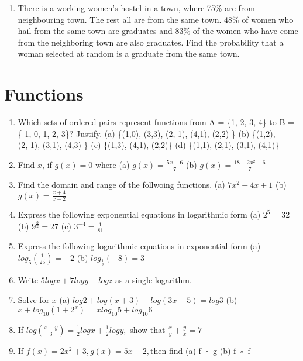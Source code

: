 \documentclass[17pt]{extarticle}
\begin{document}
\begin{multicols}{2}
\begin{enumerate}
\item There is a working women's hostel in a
town, where 75\% are from neighbouring
town. The rest all are from the same town.
48\% of women who hail from the same
town are graduates and 83\% of the women
who have come from the neighboring town
are also graduates. Find the probability that
a woman selected at random is a graduate
from the same town.




\end{enumerate} 

\section{Functions}
\noindent
\begin{enumerate}
 \item  Which sets of ordered pairs represent
functions from A = \{1, 2, 3, 4\} to B = \{-1, 0,
1, 2, 3\}? Justify. 
	 (a)	 \{(1,0), (3,3), (2,-1), (4,1), (2,2) \}    
	 (b) 	\{(1,2), (2,-1), (3,1), (4,3) \}   	 (c) 	\{(1,3), (4,1), (2,2)\}	 (d) 	\{(1,1), (2,1), (3,1), (4,1)\}
 
 \item Find $x$, if $g (x) = 0$ where  (a) $g(x)=\frac{5x-6}{7}$ (b) $g(x)=\frac{18-2x^2-6}{7}$ 
 
 \item Find the domain and range of the follwoing
functions. (a) $7x^2-4x+1$ (b) $g (x) = \frac{x+4}{x-2}$

\item Express the following exponential equations
in logarithmic form  (a) $2^5=32$ (b) $9^\frac{3}{2}=27$ (c) $3^{-4} = \frac{1}{81}$

\item Express the following logarithmic equations 	
in exponential form (a) $log_5\left( \frac{1}{25}\right)=-2$ (b) $log_\frac{1}{2}(-8)=3$ 

\item Write $5log x + 7log y - log z$ as a single
logarithm.

\item Solve for $x$ (a) $log2 + log(x+3) - log(3x-5) = log3$ (b) $x + log_{10} (1+2^x ) = x log_{10} 5 + log_{ 10}6$

\item If  $log\left(\frac{x+y}{3}\right)=\frac{1}{2}log x+ \frac{1}{2}log y, $ show that $\frac{x}{y}+\frac{y}{x}=7$


\item If  $f (x) = 2x^2 + 3, g (x) = 5x - 2, $then find
	(a) f ◦ g
	(b) f ◦ f	


\end{enumerate}
\end{multicols}
\end{document}
